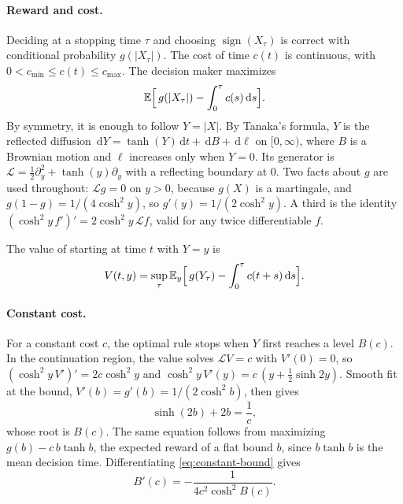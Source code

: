 \documentclass[11pt]{article}
\theoremstyle{definition}
\theoremstyle{remark}
\newcommand{\E}{\mathbb{E}}
\newcommand{\dd}{\,\mathrm{d}}
\newcommand{\Lop}{\mathcal{L}}
\begin{document}
\paragraph{Reward and cost.}
Deciding at a stopping time $\tau$ and choosing $\operatorname{sign}(X_\tau)$ is correct with
conditional probability $g(|X_\tau|)$. The cost of time $c(t)$ is continuous, with
$0 < c_{\min} \le c(t) \le c_{\max}$. The decision maker maximizes
\begin{equation}
  \E\Bigl[\, g(|X_\tau|) - \int_0^\tau c(s)\dd s \Bigr].
\end{equation}
By symmetry, it is enough to follow $Y = |X|$. By Tanaka's formula, $Y$ is the reflected diffusion
$\dd Y = \tanh(Y)\dd t + \dd B + \dd \ell$ on $[0, \infty)$, where $B$ is a Brownian motion and
$\ell$ increases only when $Y = 0$. Its generator is $\Lop = \tfrac12\partial_y^2 + \tanh(y)\partial_y$
with a reflecting boundary at 0. Two facts about $g$ are used throughout: $\Lop g = 0$ on $y > 0$,
because $g(X)$ is a martingale, and $g(1-g) = 1/(4\cosh^2 y)$, so $g'(y) = 1/(2\cosh^2 y)$. A third
is the identity $(\cosh^2 y\, f')' = 2\cosh^2 y\,\Lop f$, valid for any twice differentiable $f$.

The value of starting at time $t$ with $Y = y$ is
\begin{equation}
  V(t, y) = \sup_{\tau} \E_y\Bigl[\, g(Y_\tau) - \int_0^\tau c(t+s)\dd s \Bigr].
  \label{eq:value}
\end{equation}

\paragraph{Constant cost.}
For a constant cost $c$, the optimal rule stops when $Y$ first reaches a level $B(c)$. In the
continuation region, the value solves $\Lop V = c$ with $V'(0) = 0$, so
$(\cosh^2 y\,V')' = 2c\cosh^2 y$ and $\cosh^2 y\,V'(y) = c\,(y + \tfrac12\sinh 2y)$. Smooth fit at
the bound, $V'(b) = g'(b) = 1/(2\cosh^2 b)$, then gives
\begin{equation}
  \sinh(2b) + 2b = \frac{1}{c},
  \label{eq:constant-bound}
\end{equation}
whose root is $B(c)$. The same equation follows from maximizing $g(b) - c\,b\tanh b$, the expected
reward of a flat bound $b$, since $b\tanh b$ is the mean decision time. Differentiating
\eqref{eq:constant-bound} gives
\begin{equation}
  B'(c) = -\frac{1}{4c^2\cosh^2 B(c)}.
  \label{eq:Bprime}
\end{equation}
\end{document}
